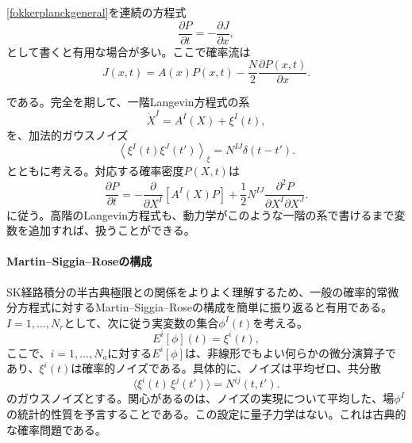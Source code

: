 \documentclass[a4paper,11pt,oneside]{article}
\theoremstyle{definition}
\numberwithin{equation}{section}
\begin{document}
\eqref{fokkerplanckgeneral}を連続の方程式
\begin{equation}
\frac{\partial P}{\partial t}
=
-
\frac{\partial J}{\partial x},
\end{equation}
として書くと有用な場合が多い。ここで確率流は
\begin{equation}
J(x,t)
=
A(x)P(x,t)
-
\frac{N}{2}
\frac{\partial P(x,t)}{\partial x}.
\end{equation}


である。完全を期して、一階Langevin方程式の系
\begin{equation}
\dot{X}^{I}
=
A^{I}(X)
+
\xi^{I}(t),
\end{equation}
を、加法的ガウスノイズ
\begin{equation}
\left\langle
\xi^{I}(t)\xi^{J}(t')
\right\rangle_{\xi}
=
N^{IJ}\delta(t-t').
\end{equation}
とともに考える。対応する確率密度\(P(X,t)\)は
\begin{equation}
\frac{\partial P}{\partial t}
=
-
\frac{\partial}{\partial X^{I}}
\left[
A^{I}(X)P
\right]
+
\frac{1}{2}
N^{IJ}
\frac{\partial^{2}P}
{\partial X^{I}\partial X^{J}}.
\end{equation}
に従う。高階のLangevin方程式も、動力学がこのような一階の系で書けるまで変数を追加すれば、扱うことができる。





\paragraph{Martin--Siggia--Roseの構成}



SK経路積分の半古典極限との関係をよりよく理解するため、一般の確率的常微分方程式に対するMartin--Siggia--Roseの構成\cite{PhysRevA.8.423}を簡単に振り返ると有用である。\(I=1,\dots,N_r\)として、次に従う実変数の集合\(\phi^I(t)\)を考える。
\begin{equation}
E^i[\phi](t)=\xi^i(t) ,
\end{equation}
ここで、\(i=1,\dots,N_a\)に対する\(E^i[\phi]\)は、非線形でもよい何らかの微分演算子であり、\(\xi^i(t)\)は確率的ノイズである。具体的に、ノイズは平均ゼロ、共分散
\begin{equation}
\langle \xi^i(t)\,\xi^j(t')\rangle
=
N^{ij}(t,t') .
\end{equation}
のガウスノイズとする。関心があるのは、ノイズの実現について平均した、場\(\phi^I\)の統計的性質を予言することである。この設定に量子力学はない。これは古典的な確率問題である。
\end{document}
